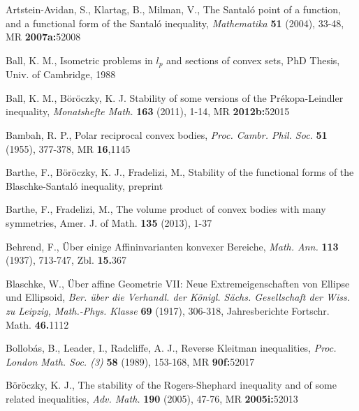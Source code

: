 \documentclass[12pt]{article}
\begin{document}



\begin{thebibliography}{999999}

Artstein-Avidan, S., Klartag, B., Milman, V.,
The Santal\'o point of a function, and a functional form of the Santal\'o
inequality,
{\it{Mathematika}}
{\bf{51}} (2004), 33-48,
MR {\bf{2007a:}}{\rm{52008}}

 Ball, K. M., Isometric problems in $l_p$ and sections of convex
sets, PhD Thesis, Univ. of Cambridge, 1988

Ball, K. M., B\"or\"oczky, K. J.
Stability of some versions of the Pr\'ekopa-Leindler inequality,
{\it{Monatshefte Math.}} {\bf{163}} (2011), 1-14,
MR {\bf{2012b:}}{\rm{52015}}

Bambah, R. P.,
Polar reciprocal convex bodies,
{\it{Proc. Cambr. Phil. Soc.}}
{\bf{51}} (1955), 377-378, MR {\bf{16}}{\rm{,1145}}

 Barthe, F., B\"or\"oczky, K. J., Fradelizi, M., 
Stability of the functional forms of the Blaschke-Santal\'o inequality,
preprint

 Barthe, F., Fradelizi, M., 
The volume product of convex bodies with many symmetries, 
Amer. J. of Math. {\bf{135}} (2013), 1-37

Behrend, F.,
\"Uber einige Affininvarianten konvexer Bereiche,
{\it{Math. Ann.}} {\bf{113}} (1937), 713-747, Zbl. {\bf{15.}}{\rm{367}}

Blaschke, W.,
\"Uber affine Geometrie VII: Neue Extremeigenschaften von Ellipse und
Ellipsoid,
{\it{Ber. \"uber die Verhandl. der K\"onigl. S\"achs. Gesellschaft der
Wiss. zu Leipzig, Math.-Phys. Klasse}}
{\bf{69}} (1917), 306-318, Jahresberichte Fortschr. Math. {\bf{46.}}1112

Bollob\'as, B., Leader, I., Radcliffe, A. J.,
Reverse Kleitman inequalities,
{\it{Proc. London Math. Soc. (3)}} {\bf{58}} (1989), 153-168,
MR {\bf{90f:}}{\rm{52017}}

B\"or\"oczky, K. J.,
The stability of the Rogers-Shephard inequality and of some related
inequalities,
{\it{Adv. Math.}} {\bf{190}} (2005), 47-76,
MR {\bf{2005i:}}{\rm{52013}}


\end{thebibliography}
\end{document}
